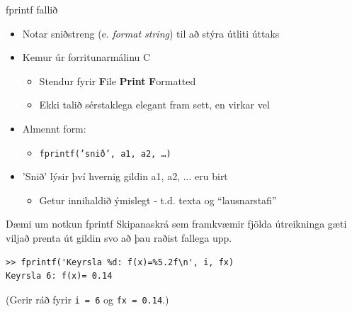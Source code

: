 \documentclass[handout]{beamer}
\begin{document}
\begin{frame}{fprintf fallið}
\begin{itemize}
 \item Notar sniðstreng (e. \emph{format string}) til að stýra útliti úttaks
 \item Kemur úr forritunarmálinu C
 \begin{itemize}
  \item Stendur fyrir \textbf{F}ile \textbf{Print} \textbf{F}ormatted
  \item Ekki talið sérstaklega elegant fram sett, en virkar vel
 \end{itemize}
 \item Almennt form:
 \begin{itemize}
  \item \texttt{fprintf('snið', a1, a2, \ldots )}
 \end{itemize}
 \item 'Snið' lýsir því hvernig gildin a1, a2, ... eru birt
 \begin{itemize}
  \item Getur innihaldið ýmislegt - t.d. texta og ``lausnarstafi''
 \end{itemize}

\end{itemize}
\end{frame}

\begin{frame}[fragile]{Dæmi um notkun fprintf}
Skipanaskrá sem framkvæmir fjölda útreikninga gæti viljað prenta út gildin svo að þau raðist fallega upp.

\begin{verbatim}
>> fprintf('Keyrsla %d: f(x)=%5.2f\n', i, fx)
Keyrsla 6: f(x)= 0.14
\end{verbatim}

(Gerir ráð fyrir \texttt{i = 6} og \texttt{fx = 0.14}.)

\end{frame}
\end{document}
